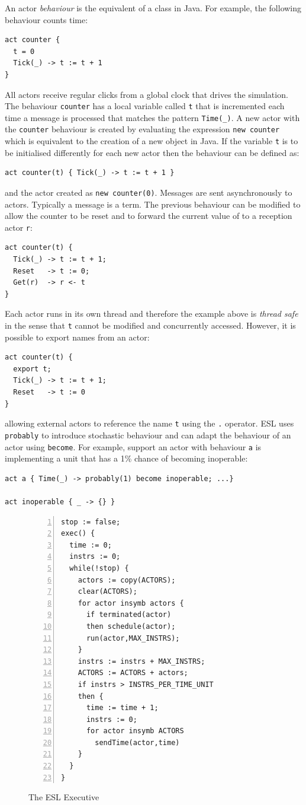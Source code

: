 \documentclass[10pt,numbers]{sigplanconf}
\def\code#1{{\normalfont\lstinline[basicstyle=\small\ttfamily]{#1}}}
\begin{document}
An actor {\it behaviour} is the equivalent of a class in Java. For example, the following behaviour counts time:
\begin{lstlisting}
act counter {
  t = 0
  Tick(_) -> t := t + 1
}
\end{lstlisting}
All actors receive regular clicks from a global clock that drives the simulation. The behaviour \code{counter} has a local variable called \code{t} that is incremented each time a message is processed that matches the pattern \code{Time(_)}. A new actor with the \code{counter} behaviour is created by evaluating the expression \code{new counter} which is equivalent to the creation of a new object in Java. If the variable \code{t} is to be initialised differently for each new actor then the behaviour can be defined as:
\begin{lstlisting}
act counter(t) { Tick(_) -> t := t + 1 }
\end{lstlisting}
and the actor created as \code{new counter(0)}. Messages are sent asynchronously to actors. Typically a message is a term. The previous behaviour can be modified to allow the counter to be reset and to forward the current value of to a reception actor \code{r}:
\begin{lstlisting}
act counter(t) { 
  Tick(_) -> t := t + 1;
  Reset   -> t := 0;
  Get(r)  -> r <- t
}
\end{lstlisting}
Each actor runs in its own thread and therefore the example above is {\it thread safe} in the sense that \code{t} cannot be modified and concurrently accessed. However, it is possible to export names from an actor:
\begin{lstlisting}
act counter(t) { 
  export t;
  Tick(_) -> t := t + 1;
  Reset   -> t := 0
}
\end{lstlisting}
allowing external actors to reference the name \code{t} using the \code{.} operator. ESL uses \code{probably} to introduce stochastic behaviour and can adapt the behaviour of an actor using \code{become}. For example, support an actor with behaviour \code{a} is implementing a unit that has a 1\% chance of becoming inoperable:
\begin{lstlisting}
act a { Time(_) -> probably(1) become inoperable; ...}

act inoperable { _ -> {} }
\end{lstlisting}

\begin{figure}
\begin{lstlisting}[numbers=left]
stop := false;
exec() {
  time := 0;
  instrs := 0;
  while(!stop) {
    actors := copy(ACTORS);
    clear(ACTORS);
    for actor insymb actors {
      if terminated(actor)
      then schedule(actor);
      run(actor,MAX_INSTRS);
    }
    instrs := instrs + MAX_INSTRS;
    ACTORS := ACTORS + actors;
    if instrs > INSTRS_PER_TIME_UNIT
    then {
      time := time + 1;
      instrs := 0;
      for actor insymb ACTORS 
        sendTime(actor,time)
    }
  }
}
\end{lstlisting}
\caption{The ESL Executive}
\label{fig:esl_executive}
\end{figure}
\end{document}
